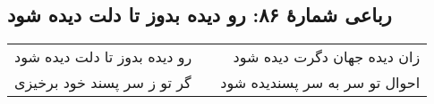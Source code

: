 \begin{center}
\section*{رباعی شمارهٔ ۸۶: رو دیده بدوز تا دلت دیده شود}
\label{sec:086}
\begin{longtable}{l p{0.5cm} r}
رو دیده بدوز تا دلت دیده شود
&&
زان دیده جهان دگرت دیده شود
\\
گر تو ز سر پسند خود برخیزی
&&
احوال تو سر به سر پسندیده شود
\\
\end{longtable}
\end{center}
